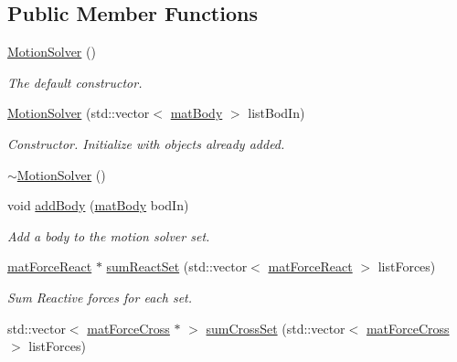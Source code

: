 \subsection*{Public Member Functions}
\begin{DoxyCompactItemize}
\item 
\hypertarget{classosea_1_1ofreq_1_1_motion_solver_a4dbc64bfeff4aab69a723c142292f787}{\hyperlink{classosea_1_1ofreq_1_1_motion_solver_a4dbc64bfeff4aab69a723c142292f787}{Motion\-Solver} ()}\label{classosea_1_1ofreq_1_1_motion_solver_a4dbc64bfeff4aab69a723c142292f787}

\begin{DoxyCompactList}\small\item\em The default constructor. \end{DoxyCompactList}\item 
\hyperlink{classosea_1_1ofreq_1_1_motion_solver_ab36901f6e752808a439890cde1c210ce}{Motion\-Solver} (std\-::vector$<$ \hyperlink{classosea_1_1ofreq_1_1mat_body}{mat\-Body} $>$ list\-Bod\-In)
\begin{DoxyCompactList}\small\item\em Constructor. Initialize with objects already added. \end{DoxyCompactList}\item 
\hyperlink{classosea_1_1ofreq_1_1_motion_solver_ae1fb5f389752a21a6d65ce41599b9b91}{$\sim$\-Motion\-Solver} ()
\item 
void \hyperlink{classosea_1_1ofreq_1_1_motion_solver_a79603cb6fede30d405f247a4d37256c1}{add\-Body} (\hyperlink{classosea_1_1ofreq_1_1mat_body}{mat\-Body} bod\-In)
\begin{DoxyCompactList}\small\item\em Add a body to the motion solver set. \end{DoxyCompactList}\item 
\hyperlink{classosea_1_1ofreq_1_1mat_force_react}{mat\-Force\-React} $\ast$ \hyperlink{classosea_1_1ofreq_1_1_motion_solver_ae30c84547cbbfdf32125b01fc34882e7}{sum\-React\-Set} (std\-::vector$<$ \hyperlink{classosea_1_1ofreq_1_1mat_force_react}{mat\-Force\-React} $>$ list\-Forces)
\begin{DoxyCompactList}\small\item\em Sum Reactive forces for each set. \end{DoxyCompactList}\item 
std\-::vector$<$ \hyperlink{classosea_1_1ofreq_1_1mat_force_cross}{mat\-Force\-Cross} $\ast$ $>$ \hyperlink{classosea_1_1ofreq_1_1_motion_solver_a791ca06422d61c08bfed2a887791b1bd}{sum\-Cross\-Set} (std\-::vector$<$ \hyperlink{classosea_1_1ofreq_1_1mat_force_cross}{mat\-Force\-Cross} $>$ list\-Forces)

\end{DoxyCompactItemize}
